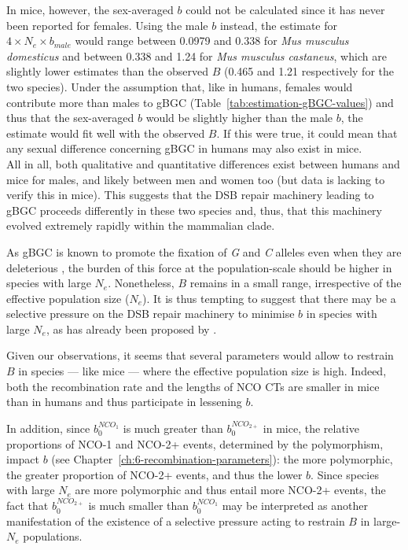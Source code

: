 In mice, however, the sex-averaged $b$ could not be calculated since it has never been reported for females.
Using the male $b$ instead, the estimate for $4 \times N_e \times b_{male}$ would range between 0.0979 and 0.338 for \textit{Mus musculus domesticus} and between 0.338 and 1.24 for \textit{Mus musculus castaneus}, which are slightly lower estimates than the observed $B$ (0.465 and 1.21 respectively for the two species).
Under the assumption that, like in humans, females would contribute more than males to gBGC (Table~\ref{tab:estimation-gBGC-values}) and thus that the sex-averaged $b$ would be slightly higher than the male $b$, the estimate would fit well with the observed $B$. If this were true, it could mean that any sexual difference concerning gBGC in humans may also exist in mice.\\



All in all, both qualitative and quantitative differences exist between humans and mice for males, and likely between men and women too (but data is lacking to verify this in mice). 
This suggests that the DSB repair machinery leading to gBGC proceeds differently in these two species and, thus, that this machinery evolved extremely rapidly within the mammalian clade.

As gBGC is known to promote the fixation of \textit{G} and \textit{C} alleles even when they are deleterious \citep{galtier2009gcbiased, necsulea2011meiotic}, the burden of this force at the population-scale should be higher in species with large $N_e$. Nonetheless, $B$ remains in a small range, irrespective of the effective population size ($N_e$). It is thus tempting to suggest that there may be a selective pressure on the DSB repair machinery to minimise $b$ in species with large $N_e$, as has already been proposed by \citet{galtier2018codon}.

Given our observations, it seems that several parameters would allow to restrain $B$ in species — like mice — where the effective population size is high.
Indeed, both the recombination rate and the lengths of NCO CTs are smaller in mice than in humans and thus participate in lessening $b$.

In addition, since $b_0^{NCO_1}$ is much greater than $b_0^{NCO_{2+}}$ in mice, the relative proportions of NCO-1 and NCO-2+ events, determined by the polymorphism, impact $b$ (see Chapter~\ref{ch:6-recombination-parameters}): the more polymorphic, the greater proportion of NCO-2+ events, and thus the lower $b$. Since species with large $N_e$ are more polymorphic and thus entail more NCO-2+ events, the fact that $b_0^{NCO_{2+}}$ is much smaller than $b_0^{NCO_1}$ may be interpreted as another manifestation of the existence of a selective pressure acting to restrain $B$ in large-$N_e$ populations.\\

